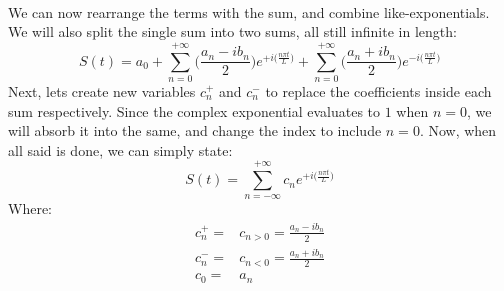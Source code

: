 \documentclass[12pt,letterpaper]{article}
\begin{document}
\paragraph*{}We can now rearrange the terms with the sum, and combine like-exponentials. We will also split the single sum into two sums, all still infinite in length:
\begin{equation}
S(t) =  a_0 +
\sum_{n=0}^{+\infty} \Big(\frac{a_n - ib_n}{2}\Big) e^{+i\big(\frac{n\pi t}{L}\big)} +
\sum_{n=0}^{+\infty} \Big(\frac{a_n + ib_n}{2}\Big) e^{-i\big(\frac{n\pi t}{L}\big)}
\end{equation}
Next, lets create new variables $c_n^+$ and $c_n^-$ to replace the coefficients inside each sum respectively. Since the complex exponential evaluates to $1$ when $n=0$, we will absorb it into the same, and change the index to include $n = 0$. Now, when all said is done, we can simply state:
\begin{equation}
S(t) = \sum_{n = -\infty}^{+\infty} c_n e^{+i\big(\frac{n\pi t}{L}\big)}
\end{equation}
Where:
\begin{equation}
\begin{split}
c_n^+ = & c_{n>0} = \frac{a_n - ib_n}{2} \\
c_n^- = & c_{n<0} = \frac{a_n + ib_n}{2} \\
c_0   = & a_n
\end{split}
\end{equation}







\end{document}
